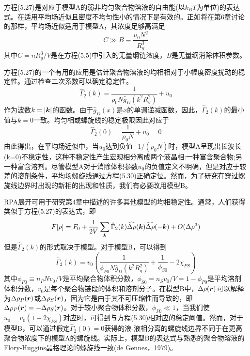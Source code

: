 方程(5.27)是对应于模型A的弱非均匀聚合物溶液的自由能(以$k_BT$为单位)的表达式。在适用平均场近似且密度不均匀性小的情况下是有效的。正如将在第6章讨论的那样，平均场近似适用于模型A，其浓度足够高满足
\begin{equation}
C\gg B\equiv\frac{u_0N^2}{R_g^3}
\end{equation}
其中$C=nR_g^3/V$是在方程(5.5)中引入的无量纲链浓度，$B$是无量纲消除体积参数。

方程(5.27)的一个有用的应用是估计聚合物溶液的均相相对于小幅度密度扰动的稳定性。通过检查二次系数可以确定稳定性。
\begin{equation}
\hat{\Gamma}_2(k)=\frac{1}{\rho_0N\hat{g}_D(k^2R_g^2)}+u_0
\end{equation}
作为波数$k=\left|\bm{k}\right|$的函数。由于$\hat{g}_D(x)$是$x$的单调递减函数，因此，$\hat{\Gamma}_2(k)$的最小值与$k=0$一致。均匀相或螺旋线的稳定极限因此对应于
\begin{equation}
\hat{\Gamma}_2(0)=\frac{1}{\rho_0N}+u_0=0
\end{equation}
由此得出，在平均场近似中，当$u_0$达到负值$-1/(\rho_0N)$时，模型A呈现出长波长(k=0)不稳定性，这种不稳定性产生宏观相分离成两个液晶相:一种富含聚合物;另一种富含溶剂。尽管模型A对于消除体积参数$u_0$的负值定义不明确，但是对应于较差的溶剂条件，平均场螺旋线通过方程(5.30)正确定位。然而，为了研究在穿过螺旋线边界时出现的新相的出现和性质，我们有必要改用模型B。

RPA展开可用于研究第4章中描述的许多其他模型的均相稳定性。通常，人们获得类似于方程(5.27)的表达式，即
\begin{equation}
F[\rho]=F_0+\frac{1}{2V}\sum\limits_{\bm{k}}\hat{\Gamma}_2(k)\widehat{\Delta\rho}(\bm{k})\widehat{\Delta\rho}(-\bm{k})+O(\Delta\rho^3)
\end{equation}
但是$\hat{\Gamma}_2(k)$的形式取决于模型。对于模型B，可以得到
\begin{equation}
\hat{\Gamma}_2(k)=v_0\left(\frac{1}{\phi_{P0}N\hat{g}_D(k^2R_g^2)}+\frac{1}{\phi_{S0}}-2\chi_{PS}\right)
\end{equation}
其中$\phi_{P0}\equiv n_PNv_0/V$是平均聚合物体积分数，$\phi_{S0}=n_Sv_0/V=1-\phi_{P0}$是平均溶剂体积分数，$v_0$是每个聚合物链段的体积和溶剂分子。在模型B中，$\Delta\rho(\bm{r})$可以解释为$\Delta\rho_P(\bm{r})$或$\Delta\rho_S(\bm{r})$，因为它是由于其不可压缩性而导致的，即$\Delta\rho_P(\bm{r})=-\Delta\rho_S(\bm{r})$。对于较小聚合物体积分数，$\phi_{P0}\ll 1$，当我们使$u_0=v_0(1-2\chi_{PS})$对应时，可得到与方程(5.30)相对应的稳定阈值。然而，对于模型B，可以通过假定$\hat{\Gamma}_2(0)=0$获得的液-液相分离的螺旋线边界不同于在更高聚合物浓度下的模型A的螺旋线。实际上，模型B的表达式与熟悉的聚合物溶液的Flory-Huggins晶格理论的螺旋线一致(de Gennes，1979)。

